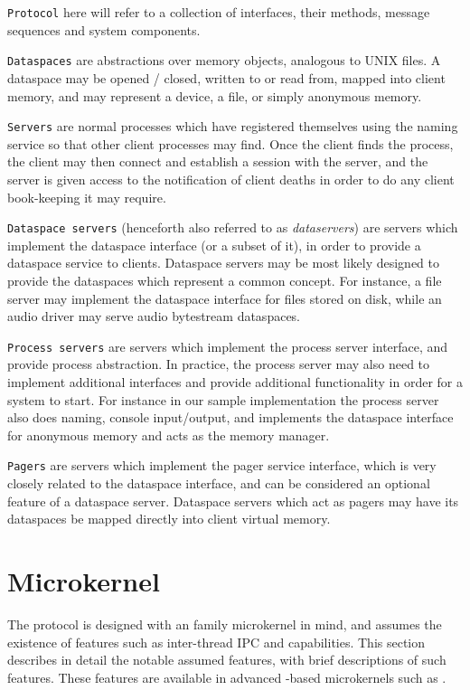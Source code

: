\texttt{Protocol} here will refer to a collection of interfaces, their methods,
message sequences and system components.

\texttt{Dataspaces} are abstractions over memory objects, analogous to UNIX files. A dataspace
may be opened / closed, written to or read from, mapped into client memory, and may represent
a device, a file, or simply anonymous memory.

\texttt{Servers} are normal processes which have registered themselves using
the naming service so that other client processes may find. Once the client
finds the process, the client may then connect and establish a session with the
server, and the server is given access to the notification of client deaths in
order to do any client book-keeping it may require.

\texttt{Dataspace servers} (henceforth also referred to as \emph{dataservers}) are
servers which implement the dataspace interface (or a subset of it), in order to
provide a dataspace service to clients. Dataspace servers may be most likely
designed to provide the dataspaces which represent a common concept. For
instance, a file server may implement the dataspace interface for files stored
on disk, while an audio driver may serve audio bytestream dataspaces.

\texttt{Process servers} are servers which implement the process server interface,
and provide process abstraction. In practice, the process server may also need
to implement additional interfaces and provide additional functionality in order
for a system to start. For instance in our sample implementation the process server
also does naming, console input/output, and implements the dataspace interface
for anonymous memory and acts as the memory manager.

\texttt{Pagers} are servers which implement the pager service interface, which
is very closely related to the dataspace interface, and can be considered an
optional feature of a dataspace server. Dataspace servers which act as pagers
may have its dataspaces be mapped directly into client virtual memory.

\section{Microkernel}

The  protocol is designed with an \Lf family microkernel in mind, and
assumes the existence of features such as inter-thread IPC and capabilities.
This section describes in detail the notable assumed features, with brief
descriptions of such features.  These features are available in advanced
\Lf-based microkernels such as \seLf.

